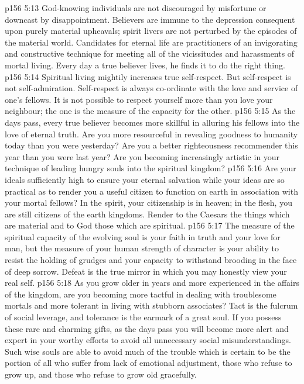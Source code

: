 \vs p156 5:13 God\hyp{}knowing individuals are not discouraged by misfortune or downcast by disappointment. Believers are immune to the depression consequent upon purely material upheavals; spirit livers are not perturbed by the episodes of the material world. Candidates for eternal life are practitioners of an invigorating and constructive technique for meeting all of the vicissitudes and harassments of mortal living. Every day a true believer lives, he finds it  to do the right thing.
\vs p156 5:14 Spiritual living mightily increases true self\hyp{}respect. But self\hyp{}respect is not self\hyp{}admiration. Self\hyp{}respect is always co\hyp{}ordinate with the love and service of one’s fellows. It is not possible to respect yourself more than you love your neighbour; the one is the measure of the capacity for the other.
\vs p156 5:15 As the days pass, every true believer becomes more skillful in alluring his fellows into the love of eternal truth. Are you more resourceful in revealing goodness to humanity today than you were yesterday? Are you a better righteousness recommender this year than you were last year? Are you becoming increasingly artistic in your technique of leading hungry souls into the spiritual kingdom?
\vs p156 5:16 Are your ideals sufficiently high to ensure your eternal salvation while your ideas are so practical as to render you a useful citizen to function on earth in association with your mortal fellows? In the spirit, your citizenship is in heaven; in the flesh, you are still citizens of the earth kingdoms. Render to the Caesars the things which are material and to God those which are spiritual.
\vs p156 5:17 The measure of the spiritual capacity of the evolving soul is your faith in truth and your love for man, but the measure of your human strength of character is your ability to resist the holding of grudges and your capacity to withstand brooding in the face of deep sorrow. Defeat is the true mirror in which you may honestly view your real self.
\vs p156 5:18 As you grow older in years and more experienced in the affairs of the kingdom, are you becoming more tactful in dealing with troublesome mortals and more tolerant in living with stubborn associates? Tact is the fulcrum of social leverage, and tolerance is the earmark of a great soul. If you possess these rare and charming gifts, as the days pass you will become more alert and expert in your worthy efforts to avoid all unnecessary social misunderstandings. Such wise souls are able to avoid much of the trouble which is certain to be the portion of all who suffer from lack of emotional adjustment, those who refuse to grow up, and those who refuse to grow old gracefully.
